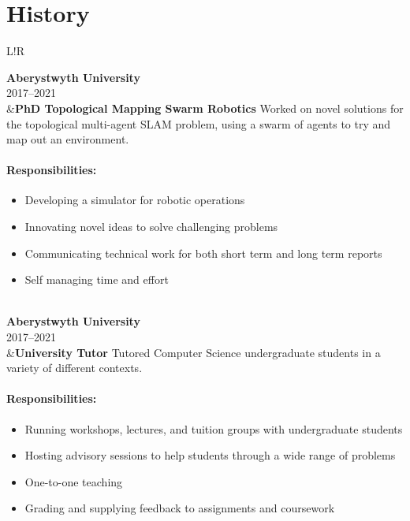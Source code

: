 \documentclass[10pt]{article}
\newcommand\VRule{\color{lightgray}\vrule width 0.5pt}
\begin{document}
\section*{History}
\begin{longtable}{L!{\VRule}R}

{\bf Aberystwyth University}\\
2017--2021\\
&{\bf PhD Topological Mapping Swarm Robotics}\newline
Worked on novel solutions for the topological multi-agent SLAM problem, using a swarm of agents to try and map out an environment.

\vspace{-3mm}
\paragraph{Responsibilities:}
\begin{itemize}[noitemsep,topsep=0pt]
	\item Developing a simulator for robotic operations
	\item Innovating novel ideas to solve challenging problems
	\item Communicating technical work for both short term and long term reports
	\item Self managing time and effort
\end{itemize}
\\

{\bf Aberystwyth University}\\
2017--2021\\
&{\bf University Tutor}\newline
Tutored Computer Science undergraduate students in a variety of different contexts.

\vspace{-3mm}
\paragraph{Responsibilities:}
\begin{itemize}[noitemsep,topsep=0pt]
	\item Running workshops, lectures, and tuition groups with undergraduate students
	\item Hosting advisory sessions to help students through a wide range of problems
	\item One-to-one teaching
	\item Grading and supplying feedback to assignments and coursework
\end{itemize}
\\


\end{longtable}
\end{document}
